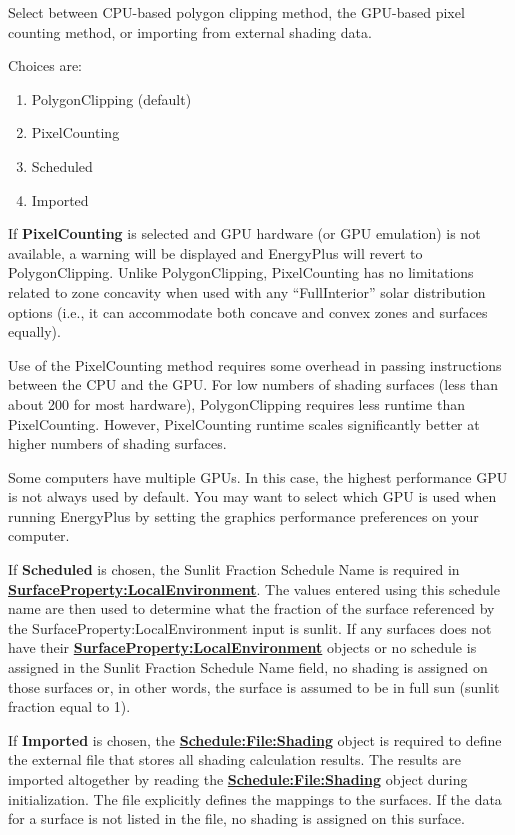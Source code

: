 Select between CPU-based polygon clipping method, the GPU-based pixel counting method, or importing from external shading data.

Choices are:
\begin{enumerate}
    \item PolygonClipping (default)
    \item PixelCounting
    \item Scheduled
    \item Imported
\end{enumerate}

If \textbf{PixelCounting} is selected and GPU hardware (or GPU emulation) is not available, a warning will be displayed and EnergyPlus will revert to PolygonClipping. Unlike PolygonClipping, PixelCounting has no limitations related to zone concavity when used with any ``FullInterior'' solar distribution options (i.e., it can accommodate both concave and convex zones and surfaces equally).

Use of the PixelCounting method requires some overhead in passing instructions between the CPU and the GPU. For low numbers of shading surfaces (less than about 200 for most hardware), PolygonClipping requires less runtime than PixelCounting. However, PixelCounting runtime scales significantly better at higher numbers of shading surfaces.

Some computers have multiple GPUs. In this case, the highest performance GPU is not always used by default. You may want to select which GPU is used when running EnergyPlus by setting the graphics performance preferences on your computer.

If \textbf{Scheduled} is chosen, the Sunlit Fraction Schedule Name is required in \textbf{\hyperref[surfacePropertylocalEnvironment]{SurfaceProperty:LocalEnvironment}}. The values entered using this schedule name are then used to determine what the fraction of the surface referenced by the SurfaceProperty:LocalEnvironment input is sunlit. If any surfaces does not have their \textbf{\hyperref[surfacePropertylocalEnvironment]{SurfaceProperty:LocalEnvironment}} objects or no schedule is assigned in the Sunlit Fraction Schedule Name field, no shading is assigned on those surfaces or, in other words, the surface is assumed to be in full sun (sunlit fraction equal to 1).

If \textbf{Imported} is chosen, the \textbf{\hyperref[schedulefileshading]{Schedule:File:Shading}} object is required to define the external file that stores all shading calculation results. The results are imported altogether by reading the \textbf{\hyperref[schedulefileshading]{Schedule:File:Shading}} object during initialization. The file explicitly defines the mappings to the surfaces. If the data for a surface is not listed in the file, no shading is assigned on this surface.

